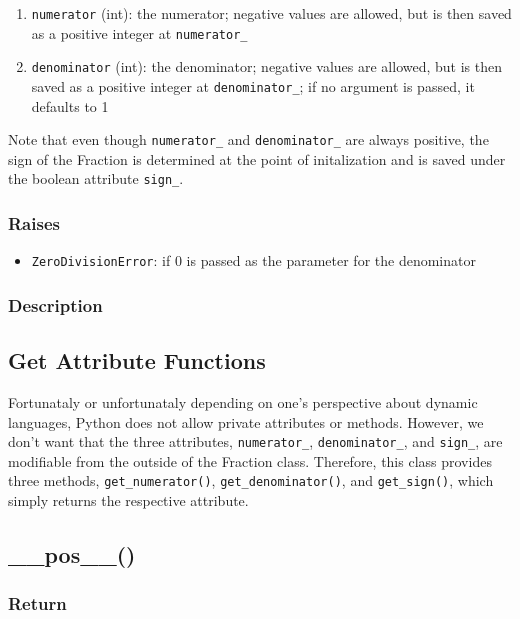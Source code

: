 \documentclass[refman]{scrartcl}
\begin{document}
\begin{enumerate}
  \item \texttt{numerator} (int): the numerator; negative values are allowed, but is then saved as a positive integer at \texttt{numerator\_}
  \item \texttt{denominator} (int): the denominator; negative values are allowed, but is then saved as a positive integer at \texttt{denominator\_}; if no argument is passed, it defaults to 1
\end{enumerate}

Note that even though \texttt{numerator\_} and \texttt{denominator\_} are always positive, the sign of the Fraction is determined at the point of initalization and is saved under the boolean attribute \texttt{sign\_}.

\subsubsection*{Raises}

\begin{itemize}
  \item \texttt{ZeroDivisionError}: if \(0\) is passed as the parameter for the denominator
\end{itemize}

\subsubsection*{Description}

\subsection{Get Attribute Functions}

Fortunataly or unfortunataly depending on one's perspective about dynamic languages, Python does not allow private attributes or methods. However, we don't want that the three attributes, \texttt{numerator\_}, \texttt{denominator\_}, and \texttt{sign\_}, are modifiable from the outside of the Fraction class. Therefore, this class provides three methods, \texttt{get\_numerator()}, \texttt{get\_denominator()}, and \texttt{get\_sign()}, which simply returns the respective attribute.

\subsection{\_\_pos\_\_()}

\subsubsection*{Return}
\end{document}
